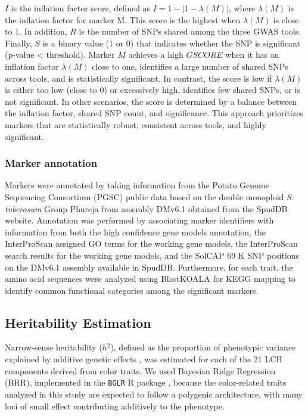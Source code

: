 \documentclass[pdflatex,sn-mathphys-ay]{sn-jnl}%
\begin{document}
 $I$ is the inflation factor score, defined as $I=1-|1-\lambda(M)|$, where $\lambda(M)$ is the inflation factor for marker M. This score is the highest when $\lambda(M)$ is close to 1. In addition, $R$ is the number of SNPs shared among the three GWAS tools. Finally, $S$ is a binary value (1 or 0) that indicates whether the SNP is significant (p-value < threshold). Marker $M$ achieves a high $GSCORE$ when it has an inflation factor $\lambda(M)$ close to one, identifies a large number of shared SNPs across tools, and is statistically significant. In contrast, the score is low if $\lambda(M)$ is either too low (close to 0) or excessively high, identifies few shared SNPs, or is not significant. In other scenarios, the score is determined by a balance between the inflation factor, shared SNP count, and significance. This approach prioritizes markers that are statistically robust, consistent across tools, and highly significant.


\subsubsection*{Marker annotation\label{subsec:OwnScoreFunction}}
Markers were annotated by taking information from the Potato Genome Sequencing Consortium (PGSC) public data based on the double monoploid \textit{S. tuberosum} Group Phureja from assembly DMv6.1\citep{Pham2020} obtained from the SpudDB website. Annotation was performed by associating marker identifiers with information from both the high confidence gene models annotation, the InterProScan assigned GO terms for the working gene models, the InterProScan search results for the working gene models, and the SolCAP 69 K SNP positions on the DMv6.1 assembly available in SpudDB. Furthermore, for each trait, the amino acid sequences were analyzed using BlastKOALA \citep{kanehisa2016blastkoala} for KEGG mapping to identify common functional categories among the significant markers.

\subsection{Heritability Estimation}
Narrow-sense heritability ($h{{}^2}$), defined as the proportion of phenotypic variance explained by additive genetic effects \citep{Campos2015}, was estimated for each of the 21 LCH components derived from color traits. We used Bayesian Ridge Regression (BRR), implemented in the \texttt{BGLR} R package \citep{Campos2014}, because the color-related traits analyzed in this study are expected to follow a polygenic architecture, with many loci of small effect contributing additively to the phenotype.
\end{document}
